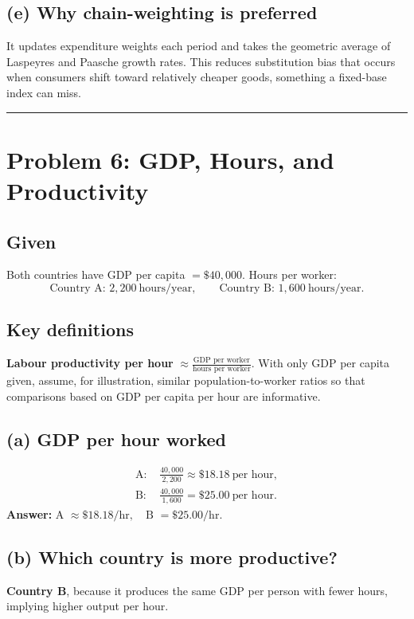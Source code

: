 \documentclass[11pt]{article}
\newcommand{\defn}[1]{\textbf{#1}}
\newcommand{\bn}{\vspace{0.25em}\noindent}
\begin{document}
\subsection*{(e) Why chain-weighting is preferred}
It updates expenditure weights each period and takes the geometric average of Laspeyres and Paasche growth rates. This reduces substitution bias that occurs when consumers shift toward relatively cheaper goods, something a fixed-base index can miss.

\bigskip
\hrule
\bigskip

\section*{Problem 6: GDP, Hours, and Productivity}

\subsection*{Given}
Both countries have GDP per capita \(=\$40{,}000\). Hours per worker:
\[
\text{Country A: }2{,}200\ \text{hours/year},\qquad
\text{Country B: }1{,}600\ \text{hours/year}.
\]

\subsection*{Key definitions}
\bn \defn{Labour productivity per hour} \(\approx \frac{\text{GDP per worker}}{\text{hours per worker}}\).
With only GDP per capita given, assume, for illustration, similar population-to-worker ratios so that comparisons based on GDP per capita per hour are informative.

\subsection*{(a) GDP per hour worked}
\[
\begin{aligned}
\text{A: } & \frac{40{,}000}{2{,}200} \approx \$18.18\ \text{per hour},\\
\text{B: } & \frac{40{,}000}{1{,}600} = \$25.00\ \text{per hour}.
\end{aligned}
\]
\textbf{Answer:} \(\boxed{\text{A } \approx \$18.18/\text{hr},\quad \text{B }=\$25.00/\text{hr}}\).

\subsection*{(b) Which country is more productive?}
\textbf{Country B}, because it produces the same GDP per person with fewer hours, implying higher output per hour.
\end{document}
